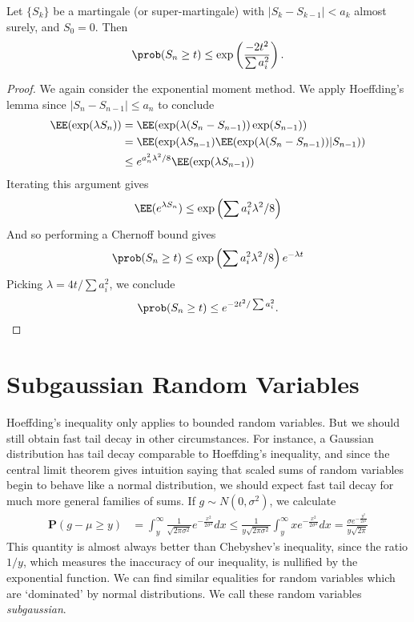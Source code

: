 \begin{theorem}
    Let $\{ S_k \}$ be a martingale (or super-martingale) with $|S_k - S_{k-1}| < a_k$ almost surely, and $S_0 = 0$. Then
    \[ \prob(S_n \geq t) \leq \exp \left( \frac{-2t^2}{\sum a_i^2} \right). \]
\end{theorem}
\begin{proof}
    We again consider the exponential moment method. We apply Hoeffding's lemma since $|S_n - S_{n-1}| \leq a_n$ to conclude
    \begin{align*}
        \EE(\exp(\lambda S_n)) &= \EE(\exp(\lambda (S_n - S_{n-1})) \exp(S_{n-1}))\\
        &= \EE( \exp(\lambda S_{n-1}) \EE( \exp(\lambda (S_n - S_{n-1})) | S_{n-1} ) )\\
        &\leq e^{a_n^2 \lambda^2 / 8} \EE( \exp(\lambda S_{n-1}) )
    \end{align*}
    Iterating this argument gives
    \[ \EE(e^{\lambda S_n}) \leq \exp \left( \sum a_i^2 \lambda^2 / 8 \right) \]
    And so performing a Chernoff bound gives
    \[ \prob(S_n \geq t) \leq \exp \left( \sum a_i^2 \lambda^2 / 8 \right) e^{-\lambda t} \]
    Picking $\lambda = 4t/\sum a_i^2$, we conclude
    \[ \prob(S_n \geq t) \leq e^{-2t^2/ \sum a_i^2}. \qedhere  \]
\end{proof}

\section{Subgaussian Random Variables}

Hoeffding's inequality only applies to bounded random variables. But we should still obtain fast tail decay in other circumstances. For instance, a Gaussian distribution has tail decay comparable to Hoeffding's inequality, and since the central limit theorem gives intuition saying that scaled sums of random variables begin to behave like a normal distribution, we should expect fast tail decay for much more general families of sums. If $g \sim N(0,\sigma^2)$, we calculate
%
\begin{align*}
    \mathbf{P}(g - \mu \geq y) &= \int_{y}^\infty \frac{1}{\sqrt{2 \pi \sigma^2}} e^{-\frac{x^2}{2 \sigma^2}} dx \leq \frac{1}{y \sqrt{2 \pi \sigma^2}} \int_{y}^\infty x e^{- \frac{x^2}{2\sigma^2}} dx = \frac{\sigma e^{- \frac{y^2}{2 \sigma^2}}}{y \sqrt{2 \pi}}
\end{align*}
%
This quantity is almost always better than Chebyshev's inequality, since the ratio $1/y$, which measures the inaccuracy of our inequality, is nullified by the exponential function. We can find similar equalities for random variables which are `dominated' by normal distributions. We call these random variables {\it subgaussian}.

